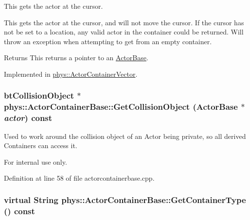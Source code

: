 This gets the actor at the cursor. 

This gets the actor at the cursor, and will not move the cursor. If the cursor has not be set to a location, any valid actor in the container could be returned. Will throw an exception when attempting to get from an empty container. \begin{DoxyReturn}{Returns}
This returns a pointer to an \hyperlink{classphys_1_1ActorBase}{ActorBase}. 
\end{DoxyReturn}


Implemented in \hyperlink{classphys_1_1ActorContainerVector_a280700490b368a963dd8feae044c7a6d}{phys::ActorContainerVector}.

\hypertarget{classphys_1_1ActorContainerBase_a3f3d84f7775d2e8597290e214fedd5f9}{
\subsubsection[{GetCollisionObject}]{\setlength{\rightskip}{0pt plus 5cm}btCollisionObject $\ast$ phys::ActorContainerBase::GetCollisionObject ({\bf ActorBase} $\ast$ {\em actor}) const}}
\label{d1/d00/classphys_1_1ActorContainerBase_a3f3d84f7775d2e8597290e214fedd5f9}


Used to work around the collision object of an Actor being private, so all derived Containers can access it. 

\begin{DoxyInternal}{For internal use only.}
\end{DoxyInternal}


Definition at line 58 of file actorcontainerbase.cpp.

\hypertarget{classphys_1_1ActorContainerBase_a0ed43bc828aaee8ee33152970c3cc16d}{
\subsubsection[{GetContainerType}]{\setlength{\rightskip}{0pt plus 5cm}virtual {\bf String} phys::ActorContainerBase::GetContainerType () const}}
\label{d1/d00/classphys_1_1ActorContainerBase_a0ed43bc828aaee8ee33152970c3cc16d}


